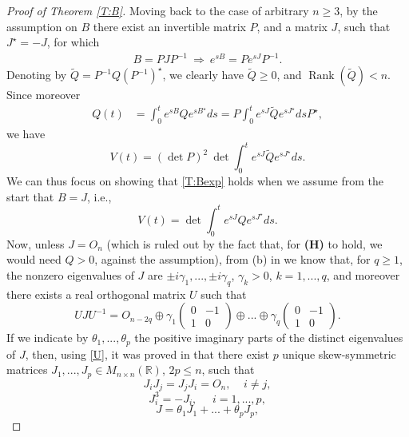 \documentclass[11pt,letter]{amsart}
\def \R {\mathbb{R}}
\numberwithin{equation}{section}
\numberwithin{equation}{section}
\begin{document}
\begin{proof}[Proof of Theorem \ref{T:B}]
\noindent Moving back to the case of arbitrary $n\ge 3$, by the assumption on $B$ there exist an invertible matrix $P$, and a matrix $J$, such that $J^\star = - J$, 
for which
\begin{align*}
B=PJP^{-1}\ \Longrightarrow\ e^{sB}=Pe^{sJ}P^{-1}.
\end{align*}
Denoting by $\tilde{Q}=P^{-1}Q (P^{-1})^{\star}$, we clearly have $\tilde Q \ge 0$, and $\operatorname{Rank}(\tilde Q)<n$. Since moreover  
\begin{align*}
Q(t) & =\int_{0}^{t}e^{sB}Qe^{sB^{\star}}ds= P\int_{0}^{t}e^{sJ} \tilde Qe^{sJ^{\star}}ds  P^{\star},
\end{align*} 
we have
\[
V(t)=(\det P)^{2}\ \det \int_{0}^{t}e^{sJ}\tilde{Q}e^{sJ^{\star}}ds.
\]
We can thus focus on showing that \eqref{T:Bexp} holds when we assume from the start that $B = J$, i.e.,
\[
V(t) = \det \int_{0}^{t}e^{sJ} Q e^{sJ^{\star}}ds.
\]  
Now, unless $J = O_n$ (which is ruled out by the fact that, for \textbf{(H)} to hold, we would need $Q>0$, against the assumption), from (b) in \cite[Cor. 2.5.11]{HJ} we know that, for $q\ge 1$, the nonzero eigenvalues of $J$ are $\pm i \gamma_1,...,\pm i \gamma_q$, $\gamma_k>0$, $k=1,...,q$, and moreover there exists a real orthogonal matrix $U$ such that  
\begin{equation}\label{U}
U J U^{-1} = O_{n-2q} \oplus \gamma_1 \begin{pmatrix} 0 & -1\\ 1 & 0\end{pmatrix} \oplus . . . \oplus \gamma_q \begin{pmatrix} 0 & -1\\ 1 & 0\end{pmatrix}.
\end{equation}
If we indicate by $\theta_1,..., \theta_p$ the positive imaginary parts of the distinct eigenvalues of $J$, then, using \eqref{U}, it was proved in \cite[Theor. 2.2]{GaXu} that there exist $p$ unique skew-symmetric matrices $J_{1},...,J_{p}\in M_{n\times n}(\R)$, $2p\le n$, such that  
\begin{equation}\label{Deco2}
J_{i} J_{j}= J_{j} J_{i}=O_{n},\ \ \ \ \ i\neq j,
\end{equation}
\begin{equation}\label{Deco3}
J_{i}^{3}=-J_{i},\ \ \ \ \ \ i = 1,...,p,
\end{equation} 
\begin{equation}\label{Deco1}
J =\theta_{1}J_{1}+...+\theta_{p}J_{p},
\end{equation}

\end{proof}
\end{document}
